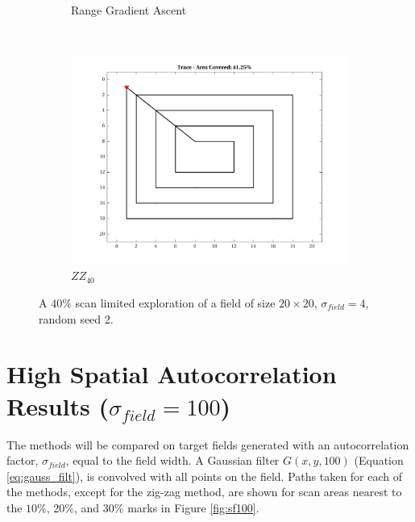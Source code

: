 \begin{figure}[htb!]
\begin{subfigure}[t]{0.3333\textwidth}
        \caption{Range Gradient Ascent}
    \end{subfigure}%
    \\
    \begin{subfigure}[t]{0.3333\textwidth}
        \centering
        \includegraphics[width=\linewidth]{figures/hbresults/path_zz_40p_20x20_sf_4_seed_2.png}
        \ssp
        \captionsetup{skip=0.20\baselineskip,size=footnotesize}
        \caption{$ZZ_{40}$}
    \end{subfigure}%
    \ssp
    \captionsetup{skip=0.20\baselineskip}
    \caption{A $40\%$ scan limited exploration of a field of size $20 \times 20$, $\sigma_{field} = 4$, random seed 2.}
    \label{fig:nbvpathcomp}
\end{figure}

\FloatBarrier
\clearpage

\section{High Spatial Autocorrelation Results ($\sigma_{field} = 100$)} \label{sec:sigma100}
The methods will be compared on target fields generated with an autocorrelation factor, $\sigma_{field}$, equal to the field width. A Gaussian filter $G(x,y,100)$ (Equation \ref{eq:gauss_filt}), is convolved with all points on the field. Paths taken for each of the methods, except for the zig-zag method, are shown for scan areas nearest to the $10\%$, $20\%$, and $30\%$ marks in Figure \ref{fig:sf100}.\\\\

